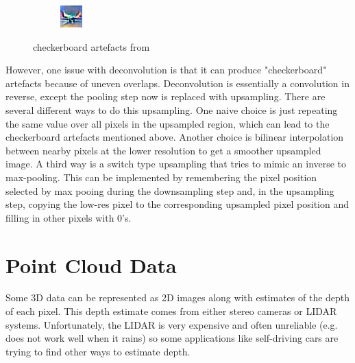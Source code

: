 \begin{figure}[ht]
\begin{subfigure}{0.25\textwidth}
    \end{subfigure}
    \begin{subfigure}{0.25\textwidth}
    \includegraphics[width=0.9\linewidth]{figs/checkerboard2.png}
    \end{subfigure}
    \caption{checkerboard artefacts from \citep{odena2016deconvolution}}
    \label{fig:checkerboard}
\end{figure}

However, one issue with deconvolution is that it can produce "checkerboard" artefacts because of uneven overlaps. Deconvolution is essentially a convolution in reverse, except the pooling step now is replaced with upsampling. There are several different ways to do this upsampling. One naive choice is just repeating the same value over all pixels in the upsampled region, which can lead to the checkerboard artefacts mentioned above. Another choice is bilinear interpolation between nearby pixels at the lower resolution to get a smoother upsampled image. A third way is a switch type upsampling that tries to mimic an inverse to max-pooling. This can be implemented by remembering the pixel position selected by max pooing during the downsampling step and, in the upsampling step, copying the low-res pixel to the corresponding upsampled pixel position and filling in other pixels with 0's.
\section{Point Cloud Data}
Some 3D data can be represented as 2D images along with estimates of the depth of each pixel. This depth estimate comes from either stereo cameras or LIDAR systems. Unfortunately, the LIDAR is very expensive and often unreliable (e.g. does not work well when it rains) so some applications like self-driving cars are trying to find other ways to estimate depth.

